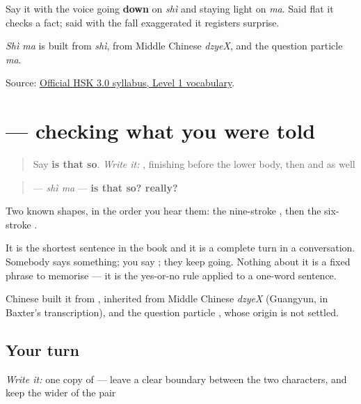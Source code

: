 Say it with the voice going \textbf{down} on \emph{shì} and staying light on \emph{ma}. Said flat it checks a fact; said with the fall exaggerated it registers surprise.

\emph{Shì ma} is built from \emph{shì}, from Middle Chinese \emph{dzyeX}, and the question particle \emph{ma}.

\begin{tcolorbox}[breakable,colback=teal!4,colframe=teal!35!black,title={Before you move on}]
Source: \href{https://hsk.cn-bj.ufileos.com/3.0/\%E6\%96\%B0\%E7\%89\%88HSK\%E8\%80\%83\%E8\%AF\%95\%E5\%A4\%A7\%E7\%BA\%B21219.pdf}{Official HSK 3.0 syllabus, Level 1 vocabulary}.
\end{tcolorbox}
\section[\texorpdfstring{\zh{是吗} (shì ma)}{是吗 (shì ma)}]{ — checking what you were told}

\label{lesson:ZH-C19-shima}



\begin{quote}
Say \textbf{is that so}. \emph{Write it:} , finishing  before the lower body, then  and  as well
\end{quote}

\begin{cousinweb}
\begin{quote}
\textbf{} — \emph{shì ma} — \textbf{is that so? really?}
\end{quote}

Two known shapes, in the order you hear them: the nine-stroke , then the six-stroke .

It is the shortest sentence in the book and it is a complete turn in a conversation. Somebody says something; you say ; they keep going. Nothing about it is a fixed phrase to memorise — it is the yes-or-no rule applied to a one-word sentence.

Chinese built it from , inherited from Middle Chinese \emph{dzyeX} (Guangyun, in Baxter's transcription), and the question particle , whose origin is not settled.
\end{cousinweb}

\subsection*{Your turn}
\emph{Write it:} one copy of \textbf{} — leave a clear boundary between the two characters, and keep  the wider of the pair

